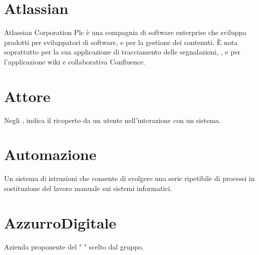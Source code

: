 \section{Atlassian}
Atlassian Corporation Plc è una compagnia di software enterprise che sviluppa prodotti per sviluppatori di software,  e per la gestione dei contenuti. È nota soprattutto per la sua applicazione di tracciamento delle segnalazioni, , e per l'applicazione wiki e collaborativa Confluence.

\section{Attore}\label{sec:Attori}
Negli , indica il  ricoperto da un utente nell'interazione con un sistema.

\section{Automazione}\label{sec:Automazioni}
Un sistema di istruzioni che consente di svolgere una serie ripetibile di processi in sostituzione del lavoro manuale sui sistemi informatici.

\section{AzzurroDigitale}
Azienda proponente del  " " scelto dal gruppo.
